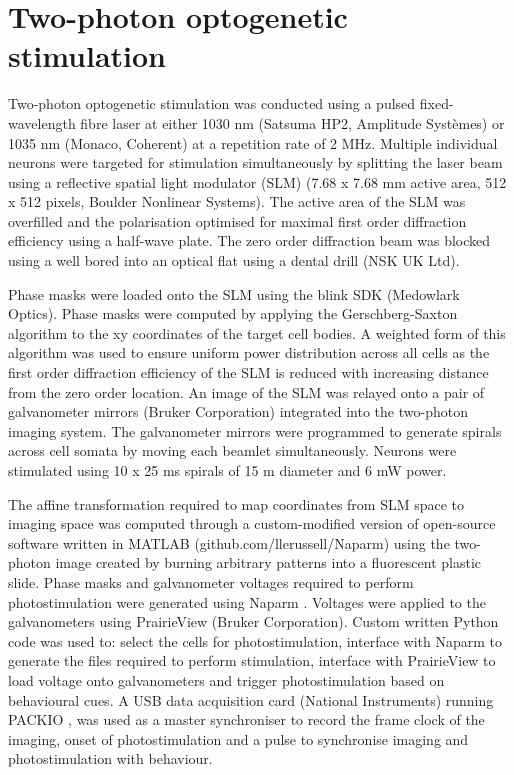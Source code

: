 \section{Two-photon optogenetic stimulation}

Two-photon optogenetic stimulation was conducted using a pulsed fixed-wavelength fibre laser at either 1030 nm (Satsuma HP2, Amplitude Systèmes) or 1035 nm (Monaco, Coherent) at a repetition rate of 2 MHz. Multiple individual neurons were targeted for stimulation simultaneously by splitting the laser beam using a reflective spatial light modulator (SLM) (7.68 x 7.68 mm active area, 512 x 512 pixels, Boulder Nonlinear Systems). The active area of the SLM was overfilled and the polarisation optimised for maximal first order diffraction efficiency using a half-wave plate. The zero order diffraction beam was blocked using a well bored into an optical flat using a dental drill (NSK UK Ltd).

Phase masks were loaded onto the SLM using the blink SDK (Medowlark Optics). Phase masks were computed by applying the Gerschberg-Saxton algorithm \cite{gerchberg_practical_1972} to the xy coordinates of the target cell bodies. A weighted form of this algorithm was used to ensure uniform power distribution across all cells as the first order diffraction efficiency of the SLM is reduced with increasing distance from the zero order location. An image of the SLM was relayed onto a pair of galvanometer mirrors (Bruker Corporation) integrated into the two-photon imaging system. The galvanometer mirrors were programmed to generate spirals across cell somata by moving each beamlet simultaneously. Neurons were stimulated using 10 x 25 ms spirals of 15 \textmu m diameter and 6 mW power.

The affine transformation required to map coordinates from SLM space to imaging space was computed through a custom-modified version of open-source software written in MATLAB (github.com/llerussell/Naparm) using the two-photon image created by burning arbitrary patterns into a fluorescent plastic slide. Phase masks and galvanometer voltages required to perform photostimulation were generated using Naparm \cite{russell_influence_2019}. Voltages were applied to the galvanometers using PrairieView (Bruker Corporation). Custom written Python code was used to: select the cells for photostimulation, interface with Naparm to generate the files required to perform stimulation, interface with PrairieView to load voltage onto galvanometers and trigger photostimulation based on behavioural cues. A USB data acquisition card (National Instruments) running PACKIO \cite{watson_packio_2016}, was used as a master synchroniser to record the frame clock of the imaging, onset of photostimulation and a pulse to synchronise imaging and photostimulation with behaviour.

